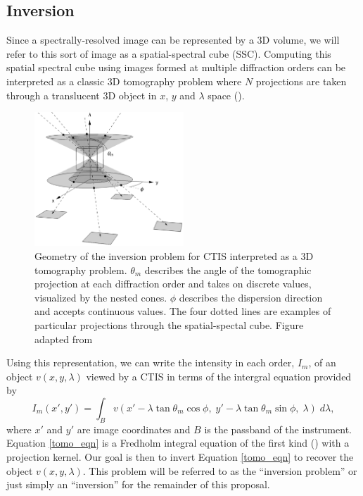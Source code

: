 \documentclass[10pt, letter]{article}
\begin{document}
			 
		\subsection{Inversion}
			\label{inv_sec}
		
			
		
			Since a spectrally-resolved image can be represented by a 3D volume, we will refer to this sort of image as a spatial-spectral cube (SSC).  Computing this spatial spectral cube using images formed at multiple diffraction orders can be interpreted as a classic 3D tomography problem where $N$ projections are taken through a translucent 3D object in $x$, $y$ and $\lambda$ space (\cite{Bulygin:05}).
			\begin{figure}[h!]
				\centering
				\includegraphics[width=0.5\textwidth]{figures/tomography}
				\caption{Geometry of the inversion problem for CTIS interpreted as a 3D tomography problem. $\theta_m$ describes the angle of the tomographic projection at each diffraction order and takes on discrete values, visualized by the nested cones. $\phi$ describes the dispersion direction and accepts continuous values. The four dotted lines are examples of particular projections through the spatial-spectal cube. Figure adapted from \cite{Bulygin:05}}
				\label{tomography}
			\end{figure}
			
			Using this representation, we can write the intensity in each order, $I_m$, of an object $v(x,y,\lambda)$ viewed by a CTIS in terms of the intergral equation provided by \cite{fox1}
			\begin{equation}
				I_m (x',y') = \int_B v(x' - \lambda \tan \theta_m \cos \phi, \; y' - \lambda \tan \theta_m \sin \phi, \; \lambda) \; d\lambda,
				\label{tomo_eqn}
			\end{equation}
			where $x'$ and $y'$ are image coordinates and $B$ is the passband of the instrument. Equation \ref{tomo_eqn} is a Fredholm integral equation of the first kind (\cite{RHB}) with a projection kernel. Our goal is then to invert Equation \ref{tomo_eqn} to recover the object $v(x,y,\lambda)$. This problem will be referred to as the ``inversion problem'' or just simply an ``inversion'' for the remainder of this proposal.
			
\end{document}
